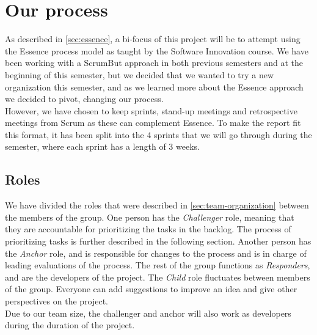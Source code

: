 \section{Our process}
As described in \autoref{sec:essence}, a bi-focus of this project will be to attempt using the Essence process model as taught by the Software Innovation course.
We have been working with a ScrumBut approach in both previous semesters and at the beginning of this semester, but we decided that we wanted to try a new organization this semester, and as we learned more about the Essence approach we decided to pivot, changing our process. \\
However, we have chosen to keep sprints, stand-up meetings and retrospective meetings from Scrum as these can complement Essence.
To make the report fit this format, it has been split into the 4 sprints that we will go through during the semester, where each sprint has a length of 3 weeks.

\subsection{Roles}
We have divided the roles that were described in \autoref{sec:team-organization} between the members of the group.
One person has the \textit{Challenger} role, meaning that they are accountable for prioritizing the tasks in the backlog.
The process of prioritizing tasks is further described in the following section.
Another person has the \textit{Anchor} role, and is responsible for changes to the process and is in charge of leading evaluations of the process.
The rest of the group functions as \textit{Responders}, and are the developers of the project.
The \textit{Child} role fluctuates between members of the group.
Everyone can add suggestions to improve an idea and give other perspectives on the project. \\
Due to our team size, the challenger and anchor will also work as developers during the duration of the project.

